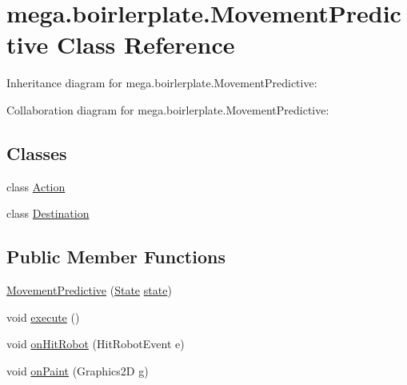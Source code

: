\hypertarget{classmega_1_1boirlerplate_1_1_movement_predictive}{}\section{mega.\+boirlerplate.\+Movement\+Predictive Class Reference}
\label{classmega_1_1boirlerplate_1_1_movement_predictive}


Inheritance diagram for mega.\+boirlerplate.\+Movement\+Predictive\+:


Collaboration diagram for mega.\+boirlerplate.\+Movement\+Predictive\+:
\subsection*{Classes}
\begin{DoxyCompactItemize}
\item 
class \hyperlink{classmega_1_1boirlerplate_1_1_movement_predictive_1_1_action}{Action}
\item 
class \hyperlink{classmega_1_1boirlerplate_1_1_movement_predictive_1_1_destination}{Destination}
\end{DoxyCompactItemize}
\subsection*{Public Member Functions}
\begin{DoxyCompactItemize}
\item 
\hyperlink{classmega_1_1boirlerplate_1_1_movement_predictive_aae1acaef2fb2c79e275c8cb120c9a6fb}{Movement\+Predictive} (\hyperlink{classmega_1_1boirlerplate_1_1_state}{State} \hyperlink{classmega_1_1boirlerplate_1_1_component_a87b0d70f323b5fee60a200e07c9c20fd}{state})
\item 
void \hyperlink{classmega_1_1boirlerplate_1_1_movement_predictive_a853ee3e04ab6da678f29c371f5b76e1a}{execute} ()
\item 
void \hyperlink{classmega_1_1boirlerplate_1_1_movement_predictive_a3b3a2c4256943bbe51a3808882674410}{on\+Hit\+Robot} (Hit\+Robot\+Event e)
\item 
void \hyperlink{classmega_1_1boirlerplate_1_1_movement_predictive_a2d58dda821300bc125d89824910f4ced}{on\+Paint} (Graphics2D g)
\end{DoxyCompactItemize}
